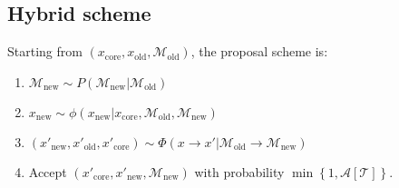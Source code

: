 \documentclass[aps,pre,twocolumn,nofootinbib,superscriptaddress,linenumbers,11point]{revtex4-1}
\begin{document}
\subsection*{Hybrid scheme}

Starting from $(x_\mathrm{core}, x_\mathrm{old}, \mathcal{M}_\mathrm{old})$, the proposal scheme is:
\begin{enumerate}
\item $\mathcal{M}_\mathrm{new} \sim P(\mathcal{M}_\mathrm{new} | \mathcal{M}_\mathrm{old})$
\item $x_\mathrm{new} \sim \phi(x_\mathrm{new} | x_\mathrm{core}, \mathcal{M}_\mathrm{old}, \mathcal{M}_\mathrm{new})$
\item $(x'_\mathrm{new}, x'_\mathrm{old}, x'_\mathrm{core}) \sim \Phi(x \rightarrow x' | \mathcal{M}_\mathrm{old} \rightarrow \mathcal{M}_\mathrm{new})$
\item Accept $(x'_\mathrm{core}, x'_\mathrm{new}, \mathcal{M}_\mathrm{new})$ with probability $\min\left\{1, \mathcal{A}[\mathcal{T}]\right\}$.
\end{enumerate}
\end{document}
